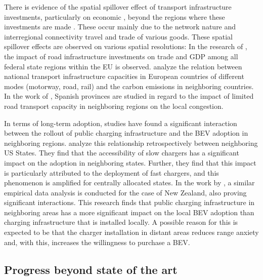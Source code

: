 \documentclass[preprint,review,11pt, authoryear]{elsarticle}
\begin{document}
    There is evidence of the spatial spill\deleted{-}over effect of transport infrastructure investments, particularly on economic , beyond the regions where these investments are made \citep{Shevtsova31122025}. These occur mainly due to the network nature and interregional connectivity travel and trade of various goods. These spatial spillover effects are observed on various spatial resolutions: In the research of \citep{Shevtsova31122025}, the impact of road infrastructure investments on trade and GDP among all federal state regions within the EU is observed. \citet{SPORKMANN2023103851} analyze the relation between national transport infrastructure capacities in European countries of different modes (motorway, road, rail) and the carbon emissions in neighboring countries. In the work of \citet{MONTOLIO200999}, Spanish provinces are studied in regard to the impact of limited road transport capacity in neighboring regions on the local congestion.

    In terms of long-term adoption, studies have found a significant interaction between the rollout of public charging infrastructure and the BEV adoption in neighboring regions. \citet{QIAN2024104400} analyze this relationship retrospectively between neighboring US States. They find that the accessibility of slow chargers has a significant impact on the adoption in neighboring states. Further, they find that this impact is particularly attributed to the deployment of fast chargers, and this phenomenon is amplified for centrally allocated states.  In the work by \citet{SELENASHENG2022103256}, a similar empirical data analysis is conducted for the case of New Zealand, also proving significant interactions. This research finds that public charging infrastructure in neighboring areas has a more significant impact on the local BEV adoption than charging infrastructure that is installed locally. A possible reason for this is expected to be that the charger installation in distant areas reduces range anxiety and, with this, increases the willingness to purchase a BEV. 
    

    \subsection{Progress beyond state of the art}
   
\end{document}
